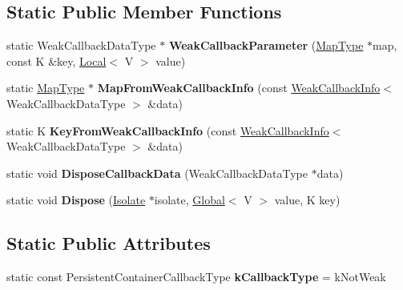 \subsection*{Static Public Member Functions}
\begin{DoxyCompactItemize}
\item 
\mbox{\label{classv8_1_1DefaultPersistentValueMapTraits_a63b6fc80207ce6ac7d1eaa306b68768c}} 
static Weak\+Callback\+Data\+Type $\ast$ {\bfseries Weak\+Callback\+Parameter} (\mbox{\hyperlink{classv8_1_1PersistentValueMap}{Map\+Type}} $\ast$map, const K \&key, \mbox{\hyperlink{classv8_1_1Local}{Local}}$<$ V $>$ value)
\item 
\mbox{\label{classv8_1_1DefaultPersistentValueMapTraits_ad5a476677abdec41871199920820e8bd}} 
static \mbox{\hyperlink{classv8_1_1PersistentValueMap}{Map\+Type}} $\ast$ {\bfseries Map\+From\+Weak\+Callback\+Info} (const \mbox{\hyperlink{classv8_1_1WeakCallbackInfo}{Weak\+Callback\+Info}}$<$ Weak\+Callback\+Data\+Type $>$ \&data)
\item 
\mbox{\label{classv8_1_1DefaultPersistentValueMapTraits_a9d757cce8008b477a513c6d30a2b6328}} 
static K {\bfseries Key\+From\+Weak\+Callback\+Info} (const \mbox{\hyperlink{classv8_1_1WeakCallbackInfo}{Weak\+Callback\+Info}}$<$ Weak\+Callback\+Data\+Type $>$ \&data)
\item 
\mbox{\label{classv8_1_1DefaultPersistentValueMapTraits_a9e5c3a4a054b13f46065adec2c44ddfe}} 
static void {\bfseries Dispose\+Callback\+Data} (Weak\+Callback\+Data\+Type $\ast$data)
\item 
\mbox{\label{classv8_1_1DefaultPersistentValueMapTraits_a28f1a2d349eb5a6ad376b6e968d51490}} 
static void {\bfseries Dispose} (\mbox{\hyperlink{classv8_1_1Isolate}{Isolate}} $\ast$isolate, \mbox{\hyperlink{classv8_1_1Global}{Global}}$<$ V $>$ value, K key)
\end{DoxyCompactItemize}
\subsection*{Static Public Attributes}
\begin{DoxyCompactItemize}
\item 
\mbox{\label{classv8_1_1DefaultPersistentValueMapTraits_a1f57d8246e4ace68bc9be1047eb7cc40}} 
static const Persistent\+Container\+Callback\+Type {\bfseries k\+Callback\+Type} = k\+Not\+Weak
\end{DoxyCompactItemize}


